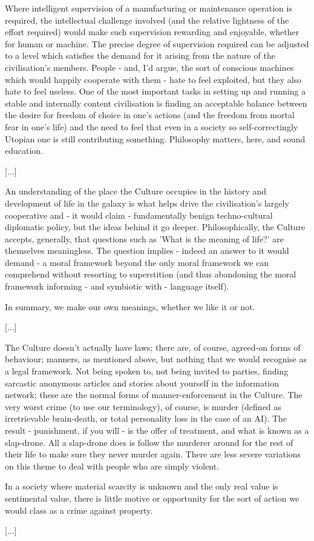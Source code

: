 \documentclass[10pt,a4paper]{article}
\begin{document}
Where intelligent supervision of a manufacturing or maintenance operation is required, the intellectual challenge involved (and the relative lightness of the effort required) would make such supervision rewarding and enjoyable, whether for human or machine. The precise degree of supervision required can be adjusted to a level which satisfies the demand for it arising from the nature of the civilisation's members. People - and, I'd argue, the sort of conscious machines which would happily cooperate with them - hate to feel exploited, but they also hate to feel useless. One of the most important tasks in setting up and running a stable and internally content civilisation is finding an acceptable balance between the desire for freedom of choice in one's actions (and the freedom from mortal fear in one's life) and the need to feel that even in a society so self-correctingly Utopian one is still contributing something. Philosophy matters, here, and sound education.

[...]

An understanding of the place the Culture occupies in the history and development of life in the galaxy is what helps drive the civilisation's largely cooperative and - it would claim - fundamentally benign techno-cultural diplomatic policy, but the ideas behind it go deeper. Philosophically, the Culture accepts, generally, that questions such as 'What is the meaning of life?' are themselves meaningless. The question implies - indeed an answer to it would demand - a moral framework beyond the only moral framework we can comprehend without resorting to superstition (and thus abandoning the moral framework informing - and symbiotic with - language itself).

In summary, we make our own meanings, whether we like it or not.

[...]

The Culture doesn't actually have laws; there are, of course, agreed-on forms of behaviour; manners, as mentioned above, but nothing that we would recognise as a legal framework. Not being spoken to, not being invited to parties, finding sarcastic anonymous articles and stories about yourself in the information network; these are the normal forms of manner-enforcement in the Culture. The very worst crime (to use our terminology), of course, is murder (defined as irretrievable brain-death, or total personality loss in the case of an AI). The result - punishment, if you will - is the offer of treatment, and what is known as a slap-drone. All a slap-drone does is follow the murderer around for the rest of their life to make sure they never murder again. There are less severe variations on this theme to deal with people who are simply violent.

In a society where material scarcity is unknown and the only real value is sentimental value, there is little motive or opportunity for the sort of action we would class as a crime against property.

[...]
\end{document}
